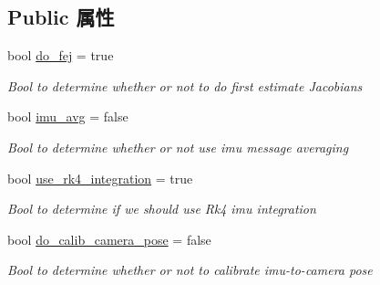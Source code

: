 \subsection*{Public 属性}
\begin{DoxyCompactItemize}
\item 
\mbox{\label{structov__msckf_1_1StateOptions_a1a4f949ad477d10523fa06322dcc0e39}} 
bool \hyperlink{structov__msckf_1_1StateOptions_a1a4f949ad477d10523fa06322dcc0e39}{do\+\_\+fej} = true
\begin{DoxyCompactList}\small\item\em Bool to determine whether or not to do first estimate Jacobians \end{DoxyCompactList}\item 
\mbox{\label{structov__msckf_1_1StateOptions_af4881f6bc94e9dc7d91adf2d064b131a}} 
bool \hyperlink{structov__msckf_1_1StateOptions_af4881f6bc94e9dc7d91adf2d064b131a}{imu\+\_\+avg} = false
\begin{DoxyCompactList}\small\item\em Bool to determine whether or not use imu message averaging \end{DoxyCompactList}\item 
\mbox{\label{structov__msckf_1_1StateOptions_ab7f0a5a223c108e959c851fd80820bb0}} 
bool \hyperlink{structov__msckf_1_1StateOptions_ab7f0a5a223c108e959c851fd80820bb0}{use\+\_\+rk4\+\_\+integration} = true
\begin{DoxyCompactList}\small\item\em Bool to determine if we should use Rk4 imu integration \end{DoxyCompactList}\item 
\mbox{\label{structov__msckf_1_1StateOptions_a9119bc2f15ba934708bf201bdb5ac225}} 
bool \hyperlink{structov__msckf_1_1StateOptions_a9119bc2f15ba934708bf201bdb5ac225}{do\+\_\+calib\+\_\+camera\+\_\+pose} = false
\begin{DoxyCompactList}\small\item\em Bool to determine whether or not to calibrate imu-\/to-\/camera pose \end{DoxyCompactList}\item 
\mbox{\label{structov__msckf_1_1StateOptions_aff5471acfde8d4ddd4cd44e940be5177}} 

\end{DoxyCompactItemize}
